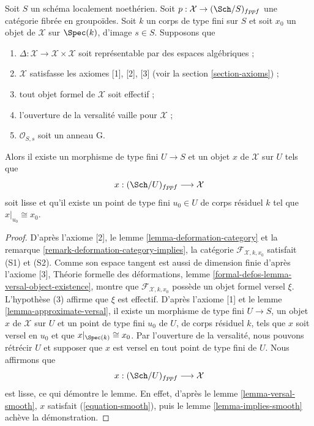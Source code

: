 \begin{lemma}
\label{lemma-get-smooth}
Soit $S$ un schéma localement noethérien. Soit
$p : \mathcal{X} \to (\Sch/S)_{fppf}$ une catégorie fibrée en groupoïdes.
Soit $k$ un corps de type fini sur $S$ et soit $x_0$ un objet de
$\mathcal{X}$ sur $\Spec(k)$, d'image $s \in S$. Supposons que
\begin{enumerate}
\item $\Delta : \mathcal{X} \to \mathcal{X} \times \mathcal{X}$ soit
représentable par des espaces algébriques ;
\item $\mathcal{X}$ satisfasse les axiomes [1], [2], [3] (voir la section
\ref{section-axioms}) ;
\item tout objet formel de $\mathcal{X}$ soit effectif ;
\item l'ouverture de la versalité vaille pour $\mathcal{X}$ ;
\item $\mathcal{O}_{S, s}$ soit un anneau G.
\end{enumerate}
Alors il existe un morphisme de type fini $U \to S$ et un objet $x$ de
$\mathcal{X}$ sur $U$ tels que
$$
x : (\Sch/U)_{fppf} \longrightarrow \mathcal{X}
$$
soit lisse et qu'il existe un point de type fini $u_0 \in U$ de corps
résiduel $k$ tel que $x|_{u_0} \cong x_0$.
\end{lemma}

\begin{proof}
D'après l'axiome [2], le lemme \ref{lemma-deformation-category} et la remarque
\ref{remark-deformation-category-implies}, la catégorie
$\mathcal{F}_{\mathcal{X}, k, x_0}$ satisfait (S1) et (S2). Comme son espace
tangent est aussi de dimension finie d'après l'axiome [3], Théorie formelle
des déformations, lemme \ref{formal-defos-lemma-versal-object-existence},
montre que $\mathcal{F}_{\mathcal{X}, k, x_0}$ possède un objet formel versel
$\xi$. L'hypothèse (3) affirme que $\xi$ est effectif. D'après l'axiome [1] et
le lemme \ref{lemma-approximate-versal}, il existe un morphisme de type fini
$U \to S$, un objet $x$ de $\mathcal{X}$ sur $U$ et un point de type fini
$u_0$ de $U$, de corps résiduel $k$, tels que $x$ soit versel en $u_0$ et que
$x|_{\Spec(k)} \cong x_0$. Par l'ouverture de la versalité, nous pouvons
rétrécir $U$ et supposer que $x$ est versel en tout point de type fini de $U$.
Nous affirmons que
$$
x : (\Sch/U)_{fppf} \longrightarrow \mathcal{X}
$$
est lisse, ce qui démontre le lemme. En effet, d'après le lemme
\ref{lemma-versal-smooth}, $x$ satisfait (\ref{equation-smooth}), puis le
lemme \ref{lemma-implies-smooth} achève la démonstration.
\end{proof}






